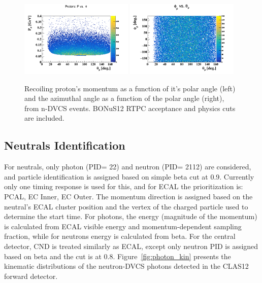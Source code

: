 \begin{figure}[htb]
\centering
   \includegraphics[width=0.48\textwidth,clip,trim=0mm 0mm 0mm 
   20mm]{figs/p_p_theta.png}
\includegraphics[width=0.48\textwidth,clip,trim=0mm 0mm 0mm 
   20mm]{figs/p_phi_theta.png}
   \caption{Recoiling proton's momentum as a function of it's polar angle 
   (left) and the azimuthal angle as a function of the polar angle (right), 
   from n-DVCS events. BONuS12 RTPC acceptance and physics cuts are included.}
   \label{fig:proton_kin}
\end{figure}
 

\subsection{Neutrals Identification} 

For neutrals, only photon (PID= 22) and neutron (PID= 2112) are considered, and 
particle identification is assigned based on simple beta cut at 0.9. Currently 
only one timing response is used for this, and for ECAL the prioritization is: 
PCAL, EC Inner, EC Outer. The momentum direction is assigned based on the 
neutral's ECAL cluster position and the vertex of the charged particle used to 
determine the start time. For photons, the energy (magnitude of the momentum) 
is calculated from ECAL visible energy and momentum-dependent sampling 
fraction, while for neutrons energy is calculated from beta. For the central 
detector, CND is treated similarly as ECAL, except only neutron PID is assigned 
based on beta and the cut is at 0.8. Figure~\ref{fig:photon_kin} presents the 
kinematic distributions of the neutron-DVCS photons detected in the CLAS12 
forward detector.


